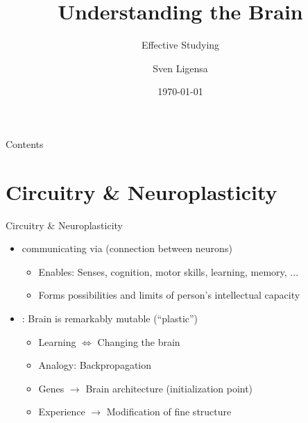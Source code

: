 \documentclass{ercisbeamer}
\title{Understanding the Brain}
\subtitle{Effective Studying}
\author{Sven Ligensa}
\institute{European Research Center for Information Systems (ERCIS)}
\date{\today}
\begin{document}
\begin{frame}
    \begin{tbox}
        \titlepage
    \end{tbox}
\end{frame}
\setbgimage{}

\begin{frame}{Contents}
    \tableofcontents
\end{frame}

\section{Circuitry \& Neuroplasticity}
\begin{frame}{Circuitry \& Neuroplasticity}
    \begin{tbox}
        \begin{itemize}
            \item {} communicating via  (connection between neurons)
            \begin{itemize}
                \item Enables: Senses, cognition, motor skills, learning, memory, ...
                \item Forms possibilities and limits of person's intellectual capacity
            \end{itemize}
            \item {}: Brain is remarkably mutable (``plastic'')
            \begin{itemize}
                \item Learning $\Leftrightarrow$ Changing the brain
                \item Analogy: Backpropagation 
                \item Genes $\rightarrow$ Brain architecture (initialization point)
                \item Experience $\rightarrow$ Modification of fine structure
            \end{itemize}
        \end{itemize}
    \end{tbox}


\end{frame}
\end{document}
